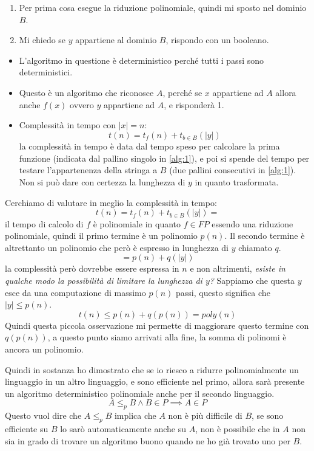 \documentclass{article}
\begin{document}
\begin{enumerate}
    \item Per prima cosa esegue la riduzione polinomiale, quindi mi sposto nel dominio $B$.
    \item Mi chiedo se $y$ appartiene al dominio $B$, rispondo con un booleano.
\end{enumerate}

\begin{itemize}
    \item L'algoritmo in questione è deterministico perché tutti i passi sono deterministici.
    \item Questo è un algoritmo che riconosce $A$, perché se $x$ appartiene ad $A$ allora
          anche $f(x)$ ovvero $y$ appartiene ad $A$, e risponderà 1.
    \item Complessità in tempo con $|x|=n$:
          $$t(n)=t_f(n)+ t_{b\in B}(|y|)$$
          la complessità in tempo è data dal tempo speso per calcolare la prima funzione (indicata
          dal pallino singolo in \ref{alg:1}), e poi si spende del tempo per testare l'appartenenza della
          stringa a $B$ (due pallini consecutivi in \ref{alg:1}). Non si può dare con certezza
          la lunghezza di $y$ in quanto trasformata.
\end{itemize}

Cerchiamo di valutare in meglio la complessità in tempo:
$$t(n)=t_f(n)+t_{b\in B}(|y|)=$$
il tempo di calcolo di $f$ è polinomiale in quanto $f\in FP$ essendo una riduzione polinomiale,
quindi il primo termine è un polinomio $p(n)$. Il secondo termine è altrettanto un polinomio
che però è espresso in lunghezza di $y$ chiamato $q$.
$$=p(n)+q(|y|)$$
la complessità però dovrebbe essere espressa in $n$ e non altrimenti, \textit{esiste
    in qualche modo la possibilità di limitare la lunghezza di $y$?} Sappiamo che questa
$y$ esce da una computazione di massimo $p(n)$ passi, questo significa che $|y|\leq p(n)$.
$$t(n)\leq p(n)+q(p(n))=poly(n)$$
Quindi questa piccola osservazione mi permette di maggiorare questo termine con $q(p(n))$,
a questo punto siamo arrivati alla fine, la somma di polinomi è ancora un polinomio.

Quindi in sostanza ho dimostrato che se io riesco a ridurre polinomialmente un linguaggio
in un altro linguaggio, e sono efficiente nel primo, allora sarà presente un algoritmo
deterministico polinomiale anche per il secondo linguaggio.
$$A\leq_p B\land B\in P\implies A\in P$$
Questo vuol dire che $A\leq_p B$ implica che $A$ non è più difficile di $B$, se sono efficiente
su $B$ lo sarò automaticamente anche su $A$, non è possibile che in $A$ non sia in grado
di trovare un algoritmo buono quando ne ho già trovato uno per $B$.
\end{document}
